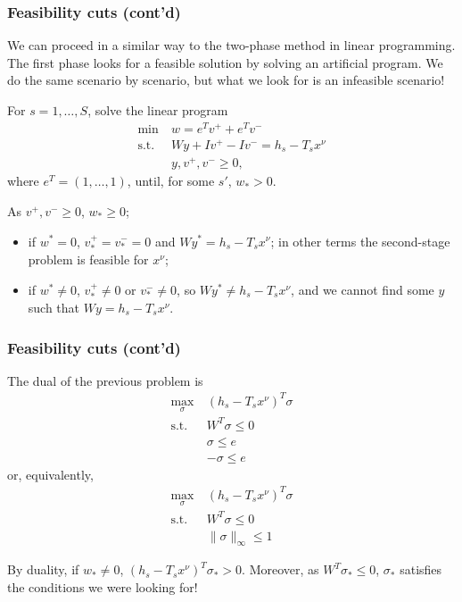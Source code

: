 \documentclass{beamer}
\begin{document}
\begin{frame}
\frametitle{Feasibility cuts (cont'd)}

We can proceed in a similar way to the two-phase method in linear programming.
The first phase looks for a feasible solution by solving an artificial program.
We do the same scenario by scenario, but what we look for is an infeasible scenario!

\mbox{}

For $s = 1,\ldots,S$, solve the linear program
\begin{align*}
\min\ & w = e^Tv^+ + e^Tv^- \\
\mbox{s.t. } & Wy + Iv^+ - Iv^- = h_s - T_sx^{\nu} \\
& y, v^+, v^- \geq 0,
\end{align*}
where $e^T = (1,\ldots,1)$, until, for some $s'$, %
$w_* > 0$.

\mbox{}

As $v^+, v^- \geq 0$, $w_* \geq 0$;
\begin{itemize}
\item 
if $w^* = 0$, $v^+_* = v^-_* = 0$ and $Wy^* = h_s - T_sx^{\nu}$; in other terms the second-stage problem is feasible for $x^{\nu}$;
\item
if $w^* \ne 0$, $v^+_* \ne 0$ or $v^-_* \ne 0$, so $Wy^* \ne h_s - T_sx^{\nu}$, and we cannot find some $y$ such that $Wy = h_s - T_sx^{\nu}$.
\end{itemize}
	
\end{frame}

\begin{frame}
\frametitle{Feasibility cuts (cont'd)}

The dual of the previous problem is
\begin{align*}
\max_{\sigma}\ & (h_s - T_sx^{\nu})^T\sigma \\
\mbox{s.t. } & W^T \sigma \leq 0 \\
& \sigma \leq e \\
& -\sigma \leq e
\end{align*}
or, equivalently,
\begin{align*}
\max_{\sigma}\ & (h_s - T_sx^{\nu})^T\sigma \\
\mbox{s.t. } & W^T \sigma \leq 0 \\
& \| \sigma \|_{\infty} \leq 1
\end{align*}

By duality, if $w_* \ne 0$, $(h_s - T_sx^{\nu})^T\sigma_* > 0$.
Moreover, as $W^T \sigma_* \leq 0$, $\sigma_*$ satisfies the conditions we were looking for!
\end{frame}
\end{document}
